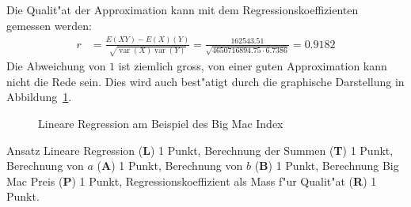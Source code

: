 \begin{loesung}
\begin{teilaufgaben}
\item
Die Qualit"at der Approximation kann mit dem Regressionskoeffizienten
gemessen werden:
\begin{align*}
r
&=
\frac{E(XY)-E(X)(Y)}{\sqrt{\operatorname{var}(X)\operatorname{var}(Y)}}
=\frac{162543.51}{\sqrt{
4650716894.75
\cdot
6.7386
}}
=0.9182
\end{align*}
Die Abweichung von $1$ ist ziemlich gross, von einer guten Approximation
kann nicht die Rede sein.
Dies wird auch best"atigt durch die graphische Darstellung in
Abbildung~\ref{40000037:lin}.
\begin{figure}
\centering
{}
\caption{Lineare Regression am Beispiel des Big Mac Index
\label{40000037:lin}}
\end{figure}
\qedhere
\end{teilaufgaben}
\end{loesung}

\begin{bewertung}
Ansatz Lineare Regression ({\bf L}) 1 Punkt,
Berechnung der Summen ({\bf T}) 1 Punkt,
Berechnung von $a$ ({\bf A}) 1 Punkt,
Berechnung von $b$ ({\bf B}) 1 Punkt,
Berechnung Big Mac Preis ({\bf P}) 1 Punkt,
Regressionskoeffizient als Mass f"ur Qualit"at ({\bf R}) 1 Punkt.
\end{bewertung}



